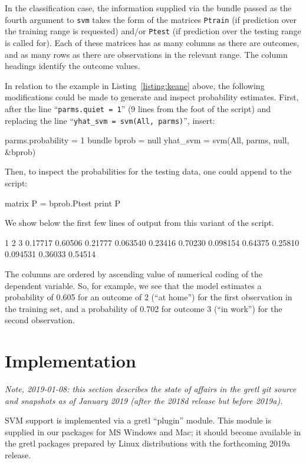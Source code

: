 \documentclass{article}
\begin{document}
In the classification case, the information supplied via the bundle
passed as the fourth argument to \texttt{svm} takes the form of the
matrices \texttt{Ptrain} (if prediction over the training range is
requested) and/or \texttt{Ptest} (if prediction over the testing range
is called for). Each of these matrices has as many columns as there
are outcomes, and as many rows as there are observations in the
relevant range. The column headings identify the outcome values.

In relation to the example in Listing~\ref{listing:keane} above, the
following modifications could be made to generate and inspect
probability estimates. First, after the line ``\texttt{parms.quiet =
  1}'' (9 lines from the foot of the script) and replacing the line
``\texttt{yhat\_svm = svm(All, parms)}'', insert:
%
\begin{code}
parms.probability = 1
bundle bprob = null
yhat_svm = svm(All, parms, null, &bprob)
\end{code}
Then, to inspect the probabilities for the testing data, one could
append to the script:
%
\begin{code}
matrix P = bprob.Ptest
print P
\end{code}
%
We show below the first few lines of output from this variant of
the script.
%
\begin{code}
           1            2            3
     0.17717      0.60506      0.21777
    0.063540      0.23416      0.70230
    0.098154      0.64375      0.25810
    0.094531      0.36033      0.54514
\end{code}
%
The columns are ordered by ascending value of numerical coding of the
dependent variable. So, for example, we see that the model estimates a
probability of 0.605 for an outcome of 2 (``at home'') for the first
observation in the training set, and a probability of 0.702 for
outcome 3 (``in work'') for the second observation.

\section{Implementation}
\label{sec:implement}

\textsl{Note, 2019-01-08: this section describes the state of affairs
  in the gretl git source and snapshots as of January 2019 (after the
  2018d release but before 2019a).}

SVM support is implemented via a gretl ``plugin'' module. This module
is supplied in our packages for MS Windows and Mac; it should become
available in the gretl packages prepared by Linux distributions with
the forthcoming 2019a release.
\end{document}
